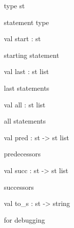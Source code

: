 \documentclass[11pt]{article}
\begin{document}
\begin{ocamldocsigend}


\label{type:Ctrlflow.CTRLFLOW.st}\begin{ocamldoccode}
type st 
\end{ocamldoccode}
\begin{ocamldocdescription}
statement type


\end{ocamldocdescription}


\label{val:Ctrlflow.CTRLFLOW.start}\begin{ocamldoccode}
val start : st
\end{ocamldoccode}
\begin{ocamldocdescription}
starting statement


\end{ocamldocdescription}


\label{val:Ctrlflow.CTRLFLOW.last}\begin{ocamldoccode}
val last : st list
\end{ocamldoccode}
\begin{ocamldocdescription}
last statements


\end{ocamldocdescription}


\label{val:Ctrlflow.CTRLFLOW.all}\begin{ocamldoccode}
val all : st list
\end{ocamldoccode}
\begin{ocamldocdescription}
all statements


\end{ocamldocdescription}


\label{val:Ctrlflow.CTRLFLOW.pred}\begin{ocamldoccode}
val pred : st -> st list
\end{ocamldoccode}
\begin{ocamldocdescription}
predecessors


\end{ocamldocdescription}


\label{val:Ctrlflow.CTRLFLOW.succ}\begin{ocamldoccode}
val succ : st -> st list
\end{ocamldoccode}
\begin{ocamldocdescription}
successors


\end{ocamldocdescription}


\label{val:Ctrlflow.CTRLFLOW.to-underscores}\begin{ocamldoccode}
val to_s : st -> string
\end{ocamldoccode}
\begin{ocamldocdescription}
for debugging


\end{ocamldocdescription}
\end{ocamldocsigend}
\end{document}
